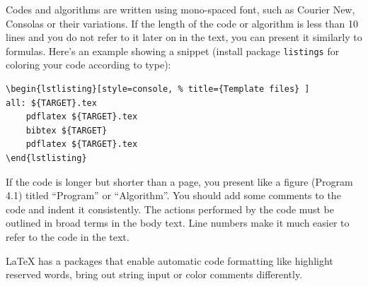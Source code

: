 Codes and algorithms are written using mono-spaced font, such as
Courier New, Consolas or their variations. If the length of the code
or algorithm is less than 10 lines and you do not refer to it later on
in the text, you can present it similarly to formulas.  Here's an
example showing a snippet (install package \verb!listings! for coloring your code according to type):

\begin{verbatim}
\begin{lstlisting}[style=console, % title={Template files} ] 
all: ${TARGET}.tex
	pdflatex ${TARGET}.tex
	bibtex ${TARGET}
	pdflatex ${TARGET}.tex
\end{lstlisting}  
\end{verbatim}


If the code is longer but shorter than a page, you present like a
figure (Program 4.1) titled ``Program'' or ``Algorithm''.
You should add some comments to the code and indent it
consistently. The actions performed by the code must be outlined in
broad terms in the body text. Line numbers make it much easier to
refer to the code in the text. 

LaTeX has a packages that enable automatic code formatting like
highlight reserved words, bring out string input or color comments differently.